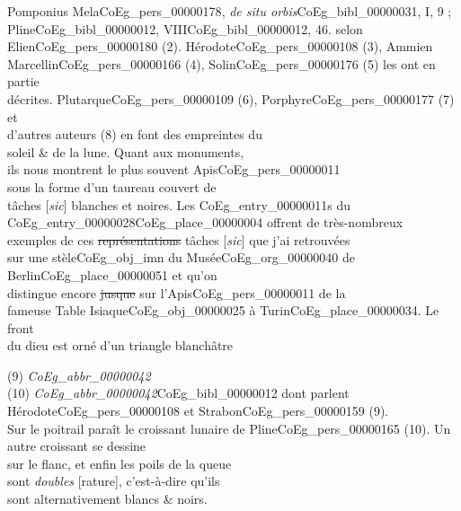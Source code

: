 \documentclass{book}
\begin{document}
{\begin{paracol}{2}
Pomponius Mela\gls{CoEg_pers_00000178}, \textit{de situ orbis}\gls{CoEg_bibl_00000031}, I, 9 ;\\
Pline\gls{CoEg_bibl_00000012}, VIII\gls{CoEg_bibl_00000012}, 46.
\switchcolumn
\noindent selon Elien\gls{CoEg_pers_00000180} (2). Hérodote\gls{CoEg_pers_00000108} (3), Ammien\\
Marcellin\gls{CoEg_pers_00000166} (4), Solin\gls{CoEg_pers_00000176} (5) les ont en partie\\
décrites. Plutarque\gls{CoEg_pers_00000109} (6), Porphyre\gls{CoEg_pers_00000177} (7) et\\
d’autres auteurs (8) en font des empreintes du\\
soleil \& de la lune. Quant aux monuments,\\
ils nous montrent le plus souvent Apis\gls{CoEg_pers_00000011}\\
sous la forme d’un taureau couvert de\\
tâches [\textit{sic}] blanches et noires. Les \glspl{CoEg_entry_00000011} du\\
\Gls{CoEg_entry_00000028}\gls{CoEg_place_00000004} offrent de très-nombreux\\
\scriptsize{exemples de ces \sout{représentations} tâches [\textit{sic}] que j’ai retrouvées}\\
sur une stèle\gls{CoEg_obj_imn} du Musée\gls{CoEg_org_00000040} de Berlin\gls{CoEg_place_00000051} et qu’on\\
distingue encore \sout{jusque} sur l’Apis\gls{CoEg_pers_00000011} de la\\
fameuse Table Isiaque\gls{CoEg_obj_00000025} à Turin\gls{CoEg_place_00000034}. Le front\\
du dieu est orné d’un triangle blanchâtre
\end{paracol}
\begin{paracol}{2}
\noindent (9) \textit{\Gls{CoEg_abbr_00000042}}\\
(10) \textit{\Gls{CoEg_abbr_00000042}}\gls{CoEg_bibl_00000012}
\switchcolumn
\noindent dont parlent Hérodote\gls{CoEg_pers_00000108} et Strabon\gls{CoEg_pers_00000159} (9).\\
Sur le poitrail paraît le croissant lunaire
de Pline\gls{CoEg_pers_00000165} (10). Un autre croissant se dessine\\
sur le flanc, et enfin les poils de la queue\\
sont \textit{doubles} [rature], c’est-à-dire qu’ils\\
sont alternativement blancs \& noirs.
\end{paracol}
}
\end{document}
